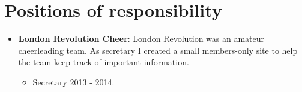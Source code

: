 \documentclass[a4paper]{article}
\begin{document}
\section*{Positions of responsibility}


\begin{itemize}
\item {\bf London Revolution Cheer}: 
London Revolution was an amateur cheerleading team.  As secretary I created a small members-only site to help the team keep track of important information.

\begin{itemize}
\item Secretary 2013 - 2014.
\end{itemize}

\end{itemize}
\end{document}
